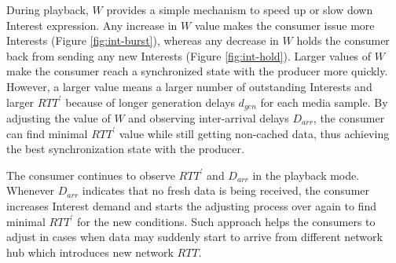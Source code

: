 \documentclass{icn/sig-alternate-2012} %
\newcommand{\wConcept}{Interest demand}
\begin{document}









During playback, $W$ provides a simple mechanism to speed up or slow down Interest expression. Any increase in $W$ value makes the consumer issue more Interests (Figure \ref{fig:int-burst}), whereas any decrease in $W$ holds the consumer back from sending any new Interests (Figure \ref{fig:int-hold}). Larger values of $W$ make the consumer reach a synchronized state with the producer more quickly. However, a larger value means a larger number of outstanding Interests and larger $RTT^\prime$ because of longer generation delays $d_{gen}$ for each media sample. By adjusting the value of $W$ and observing inter-arrival delays $D_{arr}$, the consumer can find minimal $RTT^\prime$ value while still getting non-cached data, thus achieving the best synchronization state with the producer.

The consumer continues to observe $RTT^\prime$ and $D_{arr}$ in the playback mode. Whenever $D_{arr}$ indicates that no fresh data is being received, the consumer increases \wConcept{} and starts the adjusting process over again to find minimal $RTT^\prime$ for the new conditions. Such approach helps the consumers to adjust in cases when data may suddenly start to arrive from different network hub which introduces new network $RTT$.
\end{document}
